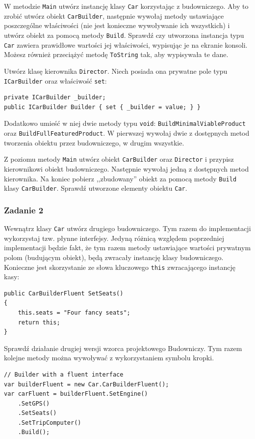 W metodzie \texttt{Main} utwórz instancję klasy \texttt{Car} korzystając z budowniczego. Aby to zrobić utwórz obiekt \texttt{CarBuilder}, następnie wywołaj metody ustawiające poszczególne właściwości (nie jest konieczne wywoływanie ich wszystkich) i utwórz obiekt za pomocą metody \texttt{Build}. Sprawdź czy utworzona instancja typu \texttt{Car} zawiera prawidłowe wartości jej właściwości, wypisując je na ekranie konsoli. Możesz również przeciążyć metodę \texttt{ToString} tak, aby wypisywała te dane.

Utwórz klasę kierownika \texttt{Director}. Niech posiada ona prywatne pole typu \texttt{ICarBuilder} oraz właściwość \texttt{set}:
\begin{lstlisting}
private ICarBuilder _builder;
public ICarBuilder Builder { set { _builder = value; } }
\end{lstlisting}
Dodatkowo umieść w niej dwie metody typu \texttt{void}: \texttt{BuildMinimalViableProduct} oraz \texttt{BuildFullFeaturedProduct}. W pierwszej wywołaj dwie z dostępnych metod tworzenia obiektu przez budowniczego, w drugim wszystkie.

Z poziomu metody \texttt{Main} utwórz obiekt \texttt{CarBuilder} oraz \texttt{Director} i przypisz kierownikowi obiekt budowniczego. Następnie wywołaj jedną z dostępnych metod kierownika. Na koniec pobierz ,,zbudowany'' obiekt za pomocą metody \texttt{Build} klasy \texttt{CarBuilder}. Sprawdź utworzone elementy obiektu \texttt{Car}.

\subsubsection{Zadanie 2}
Wewnątrz klasy \texttt{Car} utwórz drugiego budowniczego. Tym razem do implementacji wykorzystaj tzw. płynne interfejsy. Jedyną różnicą względem poprzedniej implementacji będzie fakt, że tym razem metody ustawiające wartości prywatnym polom (budującym obiekt), będą zwracały instancję klasy budowniczego. Konieczne jest skorzystanie ze słowa kluczowego \texttt{this} zwracającego instancję kasy:
\begin{lstlisting}
public CarBuilderFluent SetSeats()
{
	this.seats = "Four fancy seats";
	return this;
}
\end{lstlisting}

Sprawdź działanie drugiej wersji wzorca projektowego Budowniczy. Tym razem kolejne metody można wywoływać z wykorzystaniem symbolu kropki.
\begin{lstlisting}
// Builder with a fluent interface
var builderFluent = new Car.CarBuilderFluent();
var carFluent = builderFluent.SetEngine()
	.SetGPS()
	.SetSeats()
	.SetTripComputer()
	.Build();
\end{lstlisting}